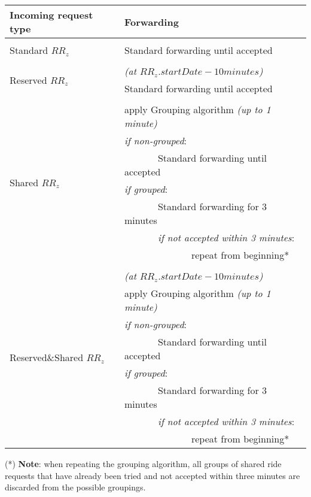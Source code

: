 	\begin{center}
		\begin{tabular}{l|l}
			\textbf{Incoming request type} & \textbf{Forwarding}\\ [1.5ex]
			\hline\hline\\
			Standard $RR_z$
			& Standard forwarding until accepted\\ [1.5ex]
			\hline\\
			\multirow{2}{15em}{Reserved $RR_z$}
			& \textit{(at $RR_z.startDate - 10 minutes$)}\\
			& Standard forwarding until accepted\\ [1.5ex]
			\hline\\
			\multirow{7}{15em}{Shared $RR_z$}
			& apply Grouping algorithm \textit{(up to 1 minute)}\\
			& \textit{if non-grouped}:\\
			& \ \ \ \ \ \ \ Standard forwarding until accepted\\
			& \textit{if grouped}:\\
			& \ \ \ \ \ \ \ Standard forwarding for 3 minutes\\
			& \ \ \ \ \ \ \ \textit{if not accepted within 3 minutes}:\\
			& \ \ \ \ \ \ \ \ \ \ \ \ \ \ repeat from beginning*\\ [1.5ex]
			\hline\\
			\multirow{8}{15em}{Reserved\&Shared $RR_z$}
			& \textit{(at $RR_z.startDate - 10 minutes$)}\\
			& apply Grouping algorithm \textit{(up to 1 minute)}\\
			& \textit{if non-grouped}:\\
			& \ \ \ \ \ \ \ Standard forwarding until accepted\\
			& \textit{if grouped}:\\
			& \ \ \ \ \ \ \ Standard forwarding for 3 minutes\\
			& \ \ \ \ \ \ \ \textit{if not accepted within 3 minutes}:\\
			& \ \ \ \ \ \ \ \ \ \ \ \ \ \ repeat from beginning*\\ [1.5ex]
			\hline
		\end{tabular}
	\end{center}
	
	(*) \textbf{Note}: when repeating the grouping algorithm, all groups of shared ride requests that have already been tried and not accepted within three minutes are discarded from the possible groupings.
	
